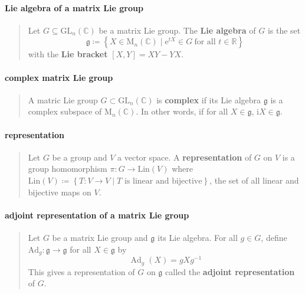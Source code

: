 \documentclass[letterpaper, 10pt]{article}
\theoremstyle{theostyle}
\begin{document}
\paragraph{Lie algebra of a matrix Lie group}
\begin{quote}
    Let \(G \subseteq \mathrm{GL}_n(\mathbb{C})\) be a matrix Lie group.
    The \textbf{Lie algebra} of \(G\) is the set 
    \[\mathfrak{g} \coloneqq \left\{X \in \mathrm{M}_n(\mathbb{C}) \mid \mathrm{e}^{tX} \in G \ \textrm{for all } t \in \mathbb{R}\right\}\]
    with the \textbf{Lie bracket} \([X, Y] = XY - YX\).
\end{quote}

\paragraph{complex matrix Lie group}
\begin{quote}
    A matric Lie group \(G \subset \mathrm{GL}_n(\mathbb{C})\) is \textbf{complex} if its Lie algebra \(\mathfrak{g}\) is a complex subspace of \(\mathrm{M}_n(\mathbb{C})\).
    In other words, if for all \(X \in \mathfrak{g}\), \(\mathrm{i}X \in \mathfrak{g}\).
\end{quote}

\paragraph{representation}
\begin{quote}
    Let \(G\) be a group and \(V\) a vector space.
    A \textbf{representation} of \(G\) on \(V\) is a group homomorphism \(\pi: G \rightarrow \mathrm{Lin}(V)\) where \(\mathrm{Lin}(V) \coloneqq \left\{ T : V \rightarrow V \mid T \text{ is linear and bijective}\right\}\),
    the set of all linear and bijective maps on \(V\).
\end{quote}

\paragraph{adjoint representation of a matrix Lie group}
\begin{quote}
    Let \(G\) be a matrix Lie group and \(\mathfrak{g}\) its Lie algebra.
    For all \(g \in G\), define \(\mathrm{Ad}_g: \mathfrak{g} \rightarrow \mathfrak{g}\) for all \(X \in \mathfrak{g}\) by
    \[\operatorname{Ad}_g{(X)} = gXg^{-1}\]
    This gives a representation of \(G\) on \(\mathfrak{g}\) called the \textbf{adjoint representation} of \(G\).
\end{quote}
\end{document}
